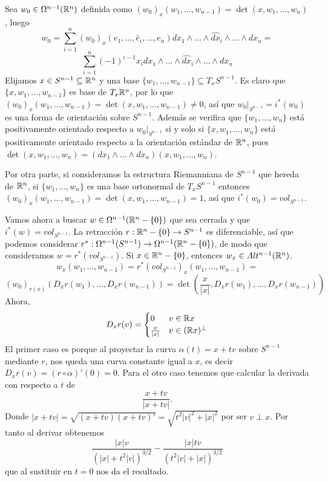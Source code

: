 \documentclass[CV.tex]{subfiles}
\begin{document}
\begin{ej}\label{9.18}
Sea $w_0\in\Omega^{n-1}(\mathbb{R}^n)$ definida como $(w_0)_x(w_1,\dots, w_{n-1})=\det(x,w_1,\dots, w_n)$, luego
\[
w_0=\sum_{i=1}^n (w_0)_x(e_1,\dots, \hat{e}_i, \dots, e_n) dx_1\land\dots\land \hat{dx}_i\land\dots\land dx_n=
\]
\[
\sum_{i=1}^n(-1)^{i-1}x_i dx_1\land\dots\land \hat{dx}_i\land\dots\land dx_n
\]
Elijamos $x\in S^{n-1}\subseteq\mathbb{R}^n$ y una base $\{w_1,\dots, w_{n-1}\}\subseteq T_x S^{n-1}$.  Es claro que $\{x, w_1,\dots, w_{n-1}\}$ es base de $T_x\mathbb{R}^n$, por lo que $(w_0)_x(w_1,\dots, w_{n-1})=\det(x,w_1,\dots, w_{n-1})\neq 0$, así que $w_0|_{S^{n-1}}=i^*(w_0)$ es una forma de orientación sobre $S^{n-1}$. Además se verifica que $\{w_1,\dots, w_n\}$ está positivamente orientado respecto a $w_0|_{S^{n-1}}$ si y solo si $\{x,w_1,\dots, w_n\}$ está positivamente orientado respecto a la orientación estándar de $\mathbb{R}^n$, pues $\det(x,w_1,\dots, w_n)=(dx_1\land\dots\land dx_n)(x, w_1,\dots, w_n)$. 

Por otra parte, si consideramos la estructura Riemanniana de $S^{n-1}$ que hereda de $\mathbb{R}^n$, si $\{w_1,\dots, w_n\}$ es una base ortonormal de $T_xS^{n-1}$ entonces $(w_0)_x(w_1,\dots, w_{n-1})=\det(x,w_1,\dots, w_{n-1})=1$, así que $i^*(w_0)=vol_{S^{n-1}}$.

Vamos ahora a buscar $w\in\Omega^{n-1}(\mathbb{R}^n-\{0\})$ que sea cerrada y que $i^*(w)=vol_{S^{n-1}}$. La retracción $r:\mathbb{R}^n-\{0\}\to S^{n-1}$ es diferenciable, así que podemos considerar $r^*:\Omega^{n-1}(S^{n-1})\to \Omega^{n-1}(\mathbb{R}^n-\{0\})$, de modo que consideramos $w=r^*(vol_{S^{n-1}})$. Si $x\in\mathbb{R}^n-\{0\}$, entonces $w_x\in Alt^{n-1}(\mathbb{R}^n)$.
\[
w_x(w_1,\dots, w_{n-1})=r^*(vol_{S^{n-1}})_x(w_1,\dots, w_{n-1})=
\]
\[
(w_0)_{r(x)}(D_x r(w_1),\dots, D_x r(w_{n-1}))=\det\left(\frac{x}{|x|}, D_x r(w_1),\dots, D_x r(w_{n-1})\right)
\]
Ahora, 
\[
D_xr(v)=\begin{cases}
0 & v\in\mathbb{R} x\\
\frac{v}{|x|} & v\in(\mathbb{R} x)^{\perp}
\end{cases}
\]
El primer caso es porque al proyectar la curva $\alpha(t)=x+tv$ sobre $S^{n-1}$ mediante $r$, nos queda una curva constante igual a $x$, es decir $D_xr(v)=(r\circ \alpha)'(0)=0$. Para el otro caso tenemos que calcular la derivada con respecto a $t$ de 
\[
\frac{x+tv}{|x+tv|}.
\]
Donde $|x+tv|=\sqrt{(x+tv)(x+tv)'}=\sqrt{t^2|v|^2+|x|^2}$ por ser $v\perp x$. Por tanto al derivar obtenemos
\[
\frac{|x| v}{(|x| + t^2 |v|)^{3/2}}-\frac{|x|tv}{(t^2|v|+|x|)^{3/2}}
\]
que al sustituir en $t=0$ nos da el resultado.


\end{ej}
\end{document}
